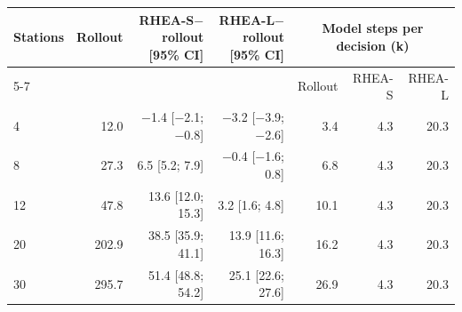\begin{tabular}{lrrrrrr}
\toprule
Stations & Rollout & RHEA-S$-$rollout [95\% CI] & RHEA-L$-$rollout [95\% CI] & \multicolumn{3}{c}{Model steps per decision (k)} \\
\cmidrule(l){5-7}
 & & & & Rollout & RHEA-S & RHEA-L \\
\midrule
4 & 12.0 & $-$1.4 [$-$2.1; $-$0.8] & $-$3.2 [$-$3.9; $-$2.6] & 3.4 & 4.3 & 20.3 \\
8 & 27.3 & 6.5 [5.2; 7.9] & $-$0.4 [$-$1.6; 0.8] & 6.8 & 4.3 & 20.3 \\
12 & 47.8 & 13.6 [12.0; 15.3] & 3.2 [1.6; 4.8] & 10.1 & 4.3 & 20.3 \\
20 & 202.9 & 38.5 [35.9; 41.1] & 13.9 [11.6; 16.3] & 16.2 & 4.3 & 20.3 \\
30 & 295.7 & 51.4 [48.8; 54.2] & 25.1 [22.6; 27.6] & 26.9 & 4.3 & 20.3 \\
\bottomrule
\end{tabular}
